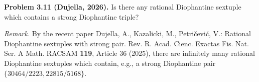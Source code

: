 \textbf{Problem 3.11 (Dujella, 2026).} Is there any rational Diophantine sextuple which contains a strong Diophantine triple?

\medskip

\textit{Remark.} By the recent paper Dujella, A., Kazalicki, M., Petričević, V.: Rational Diophantine sextuples with strong pair. Rev. R. Acad. Cienc. Exactas Fis. Nat. Ser. A Math. RACSAM \textbf{119}, Article 36 (2025), there are infinitely many rational Diophantine sextuples which contain, e.g., a strong Diophantine pair $\{30464/2223, 22815/5168\}$.
